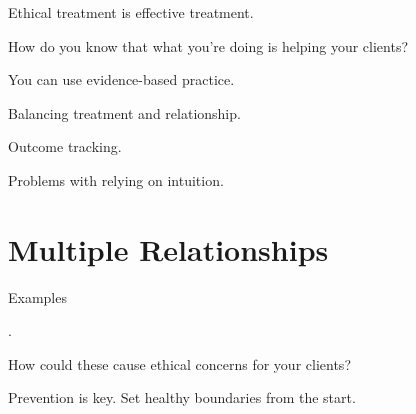 \begin{coloredlist}
    \item Ethical treatment is effective treatment.
    \item How do you know that what you're doing is helping your clients?
    \begin{coloredlist}
        \item You can use evidence-based practice.
        \begin{coloredlist}
            \item Balancing treatment and relationship.
        \end{coloredlist}
        \item Outcome tracking.
        \item Problems with relying on intuition.
    \end{coloredlist}
\end{coloredlist}

\section{Multiple Relationships}

\begin{coloredlist}
    \item Examples
    \begin{coloredlist}
        \item .
    \end{coloredlist}
    \item How could these cause ethical concerns for your clients?
    \item Prevention is key. Set healthy boundaries from the start.
\end{coloredlist}